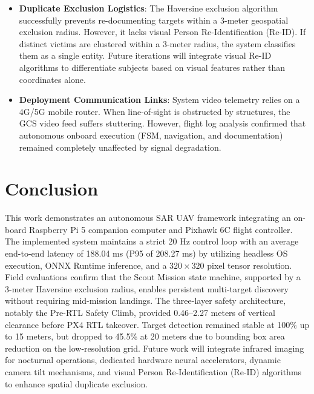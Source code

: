 \documentclass[conference]{IEEEtran}
\begin{document}
\begin{itemize}
    \item \textbf{Duplicate Exclusion Logistics}: The Haversine exclusion algorithm successfully prevents re-documenting targets within a 3-meter geospatial exclusion radius. However, it lacks visual Person Re-Identification (Re-ID). If distinct victims are clustered within a 3-meter radius, the system classifies them as a single entity. Future iterations will integrate visual Re-ID algorithms to differentiate subjects based on visual features rather than coordinates alone.
    \item \textbf{Deployment Communication Links}: System video telemetry relies on a 4G/5G mobile router. When line-of-sight is obstructed by structures, the GCS video feed suffers stuttering. However, flight log analysis confirmed that autonomous onboard execution (FSM, navigation, and documentation) remained completely unaffected by signal degradation.
\end{itemize}

\section{Conclusion}
This work demonstrates an autonomous SAR UAV framework integrating an on-board Raspberry Pi 5 companion computer and Pixhawk 6C flight controller. The implemented system maintains a strict 20 Hz control loop with an average end-to-end latency of 188.04 ms (P95 of 208.27 ms) by utilizing headless OS execution, ONNX Runtime inference, and a $320 \times 320$ pixel tensor resolution. Field evaluations confirm that the Scout Mission state machine, supported by a 3-meter Haversine exclusion radius, enables persistent multi-target discovery without requiring mid-mission landings. The three-layer safety architecture, notably the Pre-RTL Safety Climb, provided 0.46--2.27 meters of vertical clearance before PX4 RTL takeover. Target detection remained stable at 100\% up to 15 meters, but dropped to 45.5\% at 20 meters due to bounding box area reduction on the low-resolution grid. Future work will integrate infrared imaging for nocturnal operations, dedicated hardware neural accelerators, dynamic camera tilt mechanisms, and visual Person Re-Identification (Re-ID) algorithms to enhance spatial duplicate exclusion.
\end{document}
